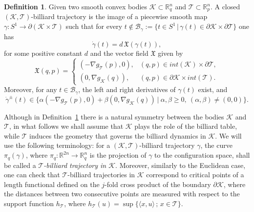 \documentclass{icmart}
\theoremstyle{definition}
\newtheorem{definition}[theorem]{Definition}
\newtheorem{remark}[theorem]{Remark}
\begin{document}
\begin{definition} \label{def-of-periodic-traj} Given two smooth convex bodies ${\mathcal K} \subset {\mathbb R}^n_q$ and ${\mathcal T} \subset {\mathbb R}^n_p$. 
A closed $({\mathcal K},{\mathcal T})$-billiard trajectory is the image of a piecewise smooth
map $\gamma \colon S^1 \rightarrow \partial ({\mathcal K} \times {\mathcal T}) $
such that for every  $t \notin {\mathcal B}_{\gamma}:= \{ t
\in S^1 \, | \, \gamma(t) \in \partial {\mathcal K}  \times \partial {\mathcal T} \}$ one has
\begin{equation*}
\dot \gamma(t) = d \, {\mathfrak X}(\gamma(t)),  \end{equation*} for some positive
 constant $d$ and the vector field ${\mathfrak X}$  given by
\begin{equation*}
{\mathfrak X}(q,p) = \left\{
\begin{array}{ll}
(-\nabla g_{\mathcal T}(p) ,0), &   (q,p) \in int({\mathcal K}) \times \partial {\mathcal T},\\
(0,\nabla g_{\mathcal K}(q)), & (q,p) \in \partial {\mathcal K} \times int({\mathcal T}).
\end{array} \right.
\end{equation*}
Moreover, for any $t \in {\mathcal B}_{\gamma}$, the left and right
derivatives of $\gamma(t)$ exist, and
\begin{equation*} \label{eq-the-cone}
\dot \gamma^{\pm}(t) \in \{   \alpha (-\nabla g_{\mathcal T}(p) ,0) + \beta
(0,\nabla g_{\mathcal K}(q))    \ | \ \alpha,\beta \geq 0,  \ (\alpha, \beta) \neq (0,0) \}.
\end{equation*}
\end{definition}
Although  in Definition~\ref{def-of-periodic-traj} 
there is a natural symmetry between the  bodies ${\mathcal K}$ and ${\mathcal T}$, 
in what follows  we shall  assume that  ${\mathcal K}$ 
plays the role of the billiard table, while  ${\mathcal T}$ induces the geometry that governs the billiard dynamics in ${\mathcal K}$.
We will use the following terminology: 
for a $({\mathcal K},{\mathcal T})$-billiard trajectory $\gamma$, the curve $\pi_q(\gamma)$,  where $\pi_q \colon {\mathbb R}^{2n} \rightarrow {\mathbb R}^n_q$ is the projection of $\gamma$ to the configuration space, 
shall be called a {\it  ${\mathcal T}$-billiard trajectory in ${\mathcal K}$}. Moreover,  similarly to the Euclidean case, one can check that ${\mathcal T}$-billiard trajectories in ${\mathcal K}$   %
correspond to critical points of a length functional defined on the $j$-fold cross product of the boundary $\partial {\mathcal K}$, where the distances between two consecutive  points are measured with respect to  
 the support function $h_{\mathcal T}$, where $h_{\mathcal T}(u) = \sup \{ \langle x,u \rangle \, ; \, x \in {\mathcal T } \}$.  %
\end{document}
